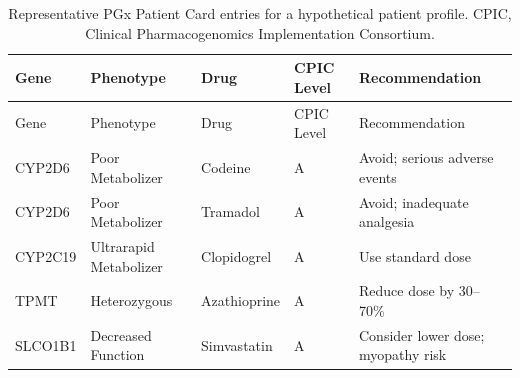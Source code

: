 \documentclass[
  12pt,
]{book}
\begin{document}
\begin{longtable}[]{@{}
  >{\raggedright\arraybackslash}p{}
  >{\raggedright\arraybackslash}p{}
  >{\raggedright\arraybackslash}p{}
  >{\centering\arraybackslash}p{}
  >{\raggedright\arraybackslash}p{}@{}}
\caption{Representative PGx Patient Card entries for a hypothetical
patient profile. CPIC, Clinical Pharmacogenomics Implementation
Consortium.}\label{tbl-pgx-card}\tabularnewline
\toprule\noalign{}
\begin{minipage}[b]{\linewidth}\raggedright
Gene
\end{minipage} & \begin{minipage}[b]{\linewidth}\raggedright
Phenotype
\end{minipage} & \begin{minipage}[b]{\linewidth}\raggedright
Drug
\end{minipage} & \begin{minipage}[b]{\linewidth}\centering
CPIC Level
\end{minipage} & \begin{minipage}[b]{\linewidth}\raggedright
Recommendation
\end{minipage} \\
\midrule\noalign{}
\endfirsthead
\toprule\noalign{}
\begin{minipage}[b]{\linewidth}\raggedright
Gene
\end{minipage} & \begin{minipage}[b]{\linewidth}\raggedright
Phenotype
\end{minipage} & \begin{minipage}[b]{\linewidth}\raggedright
Drug
\end{minipage} & \begin{minipage}[b]{\linewidth}\centering
CPIC Level
\end{minipage} & \begin{minipage}[b]{\linewidth}\raggedright
Recommendation
\end{minipage} \\
\midrule\noalign{}
\endhead
\bottomrule\noalign{}
\endlastfoot
CYP2D6 & Poor Metabolizer & Codeine & A & Avoid; serious adverse
events \\
CYP2D6 & Poor Metabolizer & Tramadol & A & Avoid; inadequate
analgesia \\
CYP2C19 & Ultrarapid Metabolizer & Clopidogrel & A & Use standard
dose \\
TPMT & Heterozygous & Azathioprine & A & Reduce dose by 30--70\% \\
SLCO1B1 & Decreased Function & Simvastatin & A & Consider lower dose;
myopathy risk \\
\end{longtable}
\end{document}
